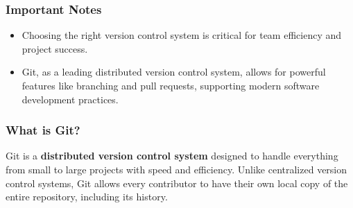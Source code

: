 \documentclass{beamer}
\begin{document}
\begin{frame}[fragile]
    \frametitle{Important Notes}
    \begin{itemize}
        \item Choosing the right version control system is critical for team efficiency and project success.
        \item Git, as a leading distributed version control system, allows for powerful features like branching and pull requests, supporting modern software development practices.
    \end{itemize}
\end{frame}

\begin{frame}[fragile]
    \frametitle{What is Git?}
    Git is a \textbf{distributed version control system} designed to handle everything from small to large projects with speed and efficiency. Unlike centralized version control systems, Git allows every contributor to have their own local copy of the entire repository, including its history.
\end{frame}
\end{document}
